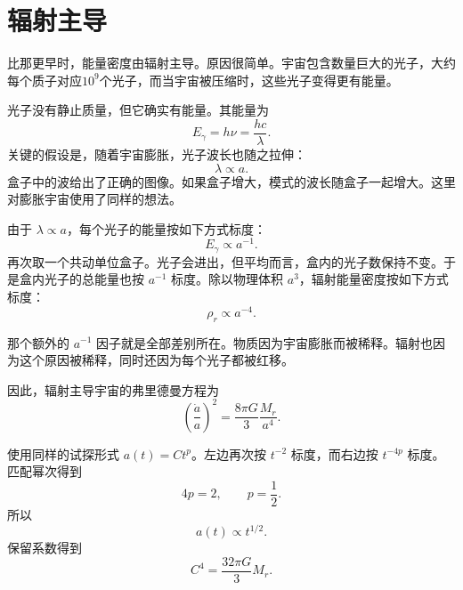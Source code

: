 \section{辐射主导}

比那更早时，能量密度由辐射主导。原因很简单。宇宙包含数量巨大的光子，大约每个质子对应\(10^9\)个光子，而当宇宙被压缩时，这些光子变得更有能量。

光子没有静止质量，但它确实有能量。其能量为
\begin{equation}
E_\gamma=h\nu=\frac{hc}{\lambda}.
\end{equation}
关键的假设是，随着宇宙膨胀，光子波长也随之拉伸：
\begin{equation}
\lambda\propto a.
\end{equation}
盒子中的波给出了正确的图像。如果盒子增大，模式的波长随盒子一起增大。这里对膨胀宇宙使用了同样的想法。

由于 \(\lambda\propto a\)，每个光子的能量按如下方式标度：
\begin{equation}
E_\gamma\propto a^{-1}.
\end{equation}
再次取一个共动单位盒子。光子会进出，但平均而言，盒内的光子数保持不变。于是盒内光子的总能量也按 \(a^{-1}\) 标度。除以物理体积 \(a^3\)，辐射能量密度按如下方式标度：
\begin{equation}
\rho_r\propto a^{-4}.
\end{equation}

那个额外的 \(a^{-1}\) 因子就是全部差别所在。物质因为宇宙膨胀而被稀释。辐射也因为这个原因被稀释，同时还因为每个光子都被红移。

因此，辐射主导宇宙的弗里德曼方程为
\begin{equation}
\left(\frac{\dot a}{a}\right)^2=\frac{8\pi G}{3}\frac{M_r}{a^4}.
\end{equation}

使用同样的试探形式 \(a(t)=Ct^p\)。左边再次按 \(t^{-2}\) 标度，而右边按 \(t^{-4p}\) 标度。匹配幂次得到
\begin{equation}
4p=2,
\qquad
p=\frac{1}{2}.
\end{equation}
所以
\begin{equation}
a(t)\propto t^{1/2}.
\end{equation}
保留系数得到
\begin{equation}
C^4=\frac{32\pi G}{3}M_r.
\end{equation}

\begin{classroomqa}
\end{classroomqa}

